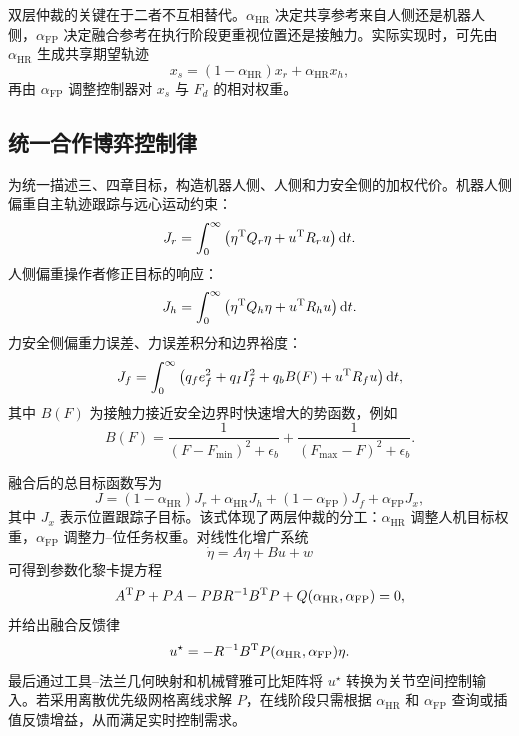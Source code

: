 双层仲裁的关键在于二者不互相替代。$\alpha_{\mathrm{HR}}$ 决定共享参考来自人侧还是机器人侧，$\alpha_{\mathrm{FP}}$ 决定融合参考在执行阶段更重视位置还是接触力。实际实现时，可先由 $\alpha_{\mathrm{HR}}$ 生成共享期望轨迹
\begin{equation}
  x_s=(1-\alpha_{\mathrm{HR}})x_r+\alpha_{\mathrm{HR}}x_h,
  \label{eq:ch5_shared_reference}
\end{equation}
再由 $\alpha_{\mathrm{FP}}$ 调整控制器对 $x_s$ 与 $F_d$ 的相对权重。

\subsection{统一合作博弈控制律}
\label{sec:ch5_fusion_control}

为统一描述三、四章目标，构造机器人侧、人侧和力安全侧的加权代价。机器人侧偏重自主轨迹跟踪与远心运动约束：
\begin{equation}
  J_r=\int_0^\infty \left(\eta^{\mathrm{T}}Q_r\eta+u^{\mathrm{T}}R_r u\right)\mathrm{d} t .
  \label{eq:ch5_robot_cost}
\end{equation}
人侧偏重操作者修正目标的响应：
\begin{equation}
  J_h=\int_0^\infty \left(\eta^{\mathrm{T}}Q_h\eta+u^{\mathrm{T}}R_h u\right)\mathrm{d} t .
  \label{eq:ch5_human_cost}
\end{equation}
力安全侧偏重力误差、力误差积分和边界裕度：
\begin{equation}
  J_f=\int_0^\infty \left(q_f e_f^2+q_I I_f^2+q_b B(F)+u^{\mathrm{T}}R_f u\right)\mathrm{d} t ,
  \label{eq:ch5_force_cost}
\end{equation}
其中 $B(F)$ 为接触力接近安全边界时快速增大的势函数，例如
\begin{equation}
  B(F)=\frac{1}{(F-F_{\min})^2+\epsilon_b}+\frac{1}{(F_{\max}-F)^2+\epsilon_b}.
  \label{eq:ch5_barrier_like_force}
\end{equation}

融合后的总目标函数写为
\begin{equation}
  J=(1-\alpha_{\mathrm{HR}})J_r+\alpha_{\mathrm{HR}}J_h
  +(1-\alpha_{\mathrm{FP}})J_f+\alpha_{\mathrm{FP}}J_x,
  \label{eq:ch5_fused_cost}
\end{equation}
其中 $J_x$ 表示位置跟踪子目标。该式体现了两层仲裁的分工：$\alpha_{\mathrm{HR}}$ 调整人机目标权重，$\alpha_{\mathrm{FP}}$ 调整力--位任务权重。对线性化增广系统
\begin{equation}
  \dot\eta=A\eta+B u+w
  \label{eq:ch5_linearized_aug}
\end{equation}
可得到参数化黎卡提方程
\begin{equation}
  A^{\mathrm{T}}P+PA-PBR^{-1}B^{\mathrm{T}}P+Q(\alpha_{\mathrm{HR}},\alpha_{\mathrm{FP}})=0,
  \label{eq:ch5_riccati}
\end{equation}
并给出融合反馈律
\begin{equation}
  u^{\star}=-R^{-1}B^{\mathrm{T}}P(\alpha_{\mathrm{HR}},\alpha_{\mathrm{FP}})\eta.
  \label{eq:ch5_feedback_law}
\end{equation}
最后通过工具--法兰几何映射和机械臂雅可比矩阵将 $u^{\star}$ 转换为关节空间控制输入。若采用离散优先级网格离线求解 $P$，在线阶段只需根据 $\alpha_{\mathrm{HR}}$ 和 $\alpha_{\mathrm{FP}}$ 查询或插值反馈增益，从而满足实时控制需求。

